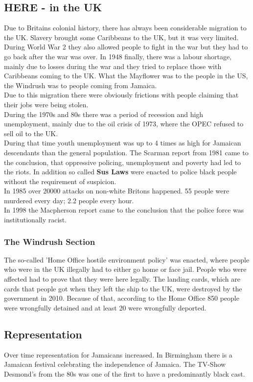 \documentclass{article}
\begin{document}
	\subsection{HERE - in the UK}
	Due to Britains colonial history, there has always been considerable migration to the UK. Slavery brought some Caribbeans to the UK, but it was very limited. During World War 2 they also allowed people to fight in the war but they had to go back after the war was over. In 1948 finally, there was a labour shortage, mainly due to losses during the war and they tried to replace those with Caribbeans coming to the UK. What the Mayflower was to the people in the US, the Windrush was to people coming from Jamaica. \\
	Due to this migration there were obviously frictions with people claiming that their jobs were being stolen. \\
	During the 1970s and 80s there was a period of recession and high unemployment, mainly due to the oil crisis of 1973, where the OPEC refused to sell oil to the UK. \\
	During that time youth unemployment was up to 4 times as high for Jamaican descendants than the general population. The Scarman report from 1981 came to the conclusion, that oppressive policing, unemployment and poverty had led to the riots. In addition so called \textbf{Sus Laws} were enacted to police black people without the requirement of suspicion. \\
	In 1985 over 20000 attacks on non-white Britons happened. 55 people were murdered every day; 2.2 people every hour. \\
	In 1998 the Macpherson report came to the conclusion that the police force was institutionally racist. \\
	\subsubsection{The Windrush Section}
	The so-called 'Home Office hostile environment policy' was enacted, where people who were in the UK illegally had to either go home or face jail. People who were affected had to prove that they were here legally. The landing cards, which are cards that people got when they left the ship to the UK, were destroyed by the government in 2010. Because of that, according to the Home Office 850 people were wrongfully detained and at least 20 were wrongfully deported. \\
	\subsection{Representation}
	Over time representation for Jamaicans increased. In Birmingham there is a Jamaican festival celebrating the independence of Jamaica. The TV-Show Desmond's from the 80s was one of the first to have a predominantly black cast. \\
\end{document}
